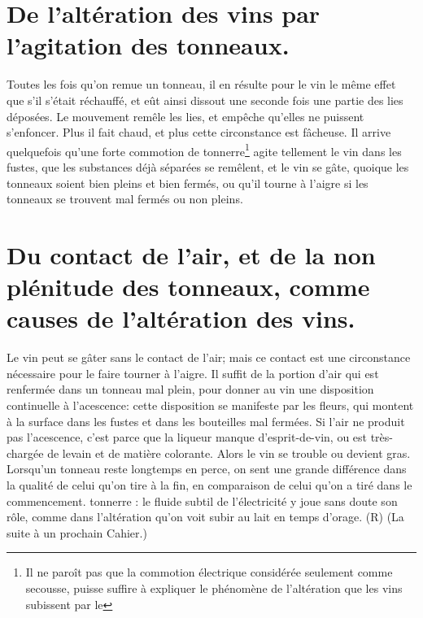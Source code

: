 \section{De l'altération des vins par l'agitation des tonneaux.}
Toutes les fois qu'on remue un tonneau, il en résulte pour le vin le même effet que s'il s'était réchauffé, et eût ainsi dissout une seconde fois une partie des lies déposées. Le mouvement remêle les lies, et empêche qu'elles ne puissent s'enfoncer. Plus il fait chaud, et plus cette circonstance est fâcheuse. Il arrive quelquefois qu'une forte commotion de tonnerre\footnote{Il ne paroît pas que la commotion électrique considérée seulement comme secousse, puisse suffire à expliquer le phénomène de l'altération que les vins subissent par le} agite tellement le vin dans\setcounter{page}{328} les fustes, que les substances déjà séparées se remêlent, et le vin se gâte, quoique les tonneaux soient bien pleins et bien fermés, ou qu'il tourne à l'aigre si les tonneaux se trouvent mal fermés ou non pleins.
\section{Du contact de l'air, et de la non plénitude des tonneaux, comme causes de l'altération des vins.}
Le vin peut se gâter sans le contact de l'air; mais ce contact est une circonstance nécessaire pour le faire tourner à l'aigre. Il suffit de la portion d'air qui est renfermée dans un tonneau mal plein, pour donner au vin une disposition continuelle à l'acescence: cette disposition se manifeste par les fleurs, qui montent à la surface dans les fustes et dans les bouteilles mal fermées.
Si l'air ne produit pas l'acescence, c'est parce que la liqueur manque d'esprit-de-vin, ou est très-chargée de levain et de matière colorante. Alors le vin se trouble ou devient gras. Lorsqu'un tonneau reste longtemps en perce, on sent une grande différence dans la qualité de celui qu'on tire à la fin, en comparaison de celui qu'on a tiré dans le commencement.
tonnerre : le fluide subtil de l'électricité y joue sans doute son rôle, comme dans l'altération qu'on voit subir au lait en temps d'orage. (R)
(La suite à un prochain Cahier.)